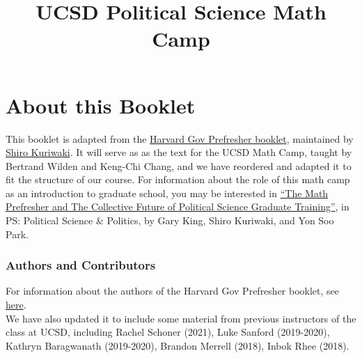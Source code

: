 \documentclass[
  letterpaper,
]{book}
\title{UCSD Political Science Math Camp}
\author{}
\date{}
\renewcommand*\contentsname{Table of contents}
\newcommand\contentsname{Table of contents}
\theoremstyle{definition}
\theoremstyle{definition}
\theoremstyle{plain}
\theoremstyle{definition}
\theoremstyle{plain}
\theoremstyle{plain}
\theoremstyle{remark}
\begin{document}
\frontmatter
\maketitle
\ifdefined\Shaded\renewenvironment{Shaded}{\begin{tcolorbox}[boxrule=0pt, borderline west={3pt}{0pt}{shadecolor}, sharp corners, breakable, frame hidden, enhanced, interior hidden]}{\end{tcolorbox}}\fi

\renewcommand*\contentsname{Table of contents}
{
\hypersetup{linkcolor=}
\setcounter{tocdepth}{2}
\tableofcontents
}
\listoffigures
\listoftables
\mainmatter
{}

\hypertarget{about-this-booklet}{%
\chapter*{About this Booklet}\label{about-this-booklet}}

This booklet is adapted from the
\href{https://iqss.github.io/prefresher/}{Harvard Gov Prefresher
booklet}, maintained by \href{https://www.shirokuriwaki.com}{Shiro
Kuriwaki}. It will serve as as the text for the UCSD Math Camp, taught
by Bertrand Wilden and Keng-Chi Chang, and we have reordered and adapted
it to fit the structure of our course. For information about the role of
this math camp as an introduction to graduate school, you may be
interested in \href{https://gking.harvard.edu/prefresher}{``The Math
Prefresher and The Collective Future of Political Science Graduate
Training''}, in PS: Political Science \& Politics, by Gary King, Shiro
Kuriwaki, and Yon Soo Park.

\hypertarget{authors-and-contributors}{%
\subsection*{Authors and Contributors}\label{authors-and-contributors}}

For information about the authors of the Harvard Gov Prefresher booklet,
see
\href{https://iqss.github.io/prefresher/index.html\#authors-and-contributors}{here}.\\
We have also updated it to include some material from previous
instructors of the class at UCSD, including Rachel Schoner (2021), Luke
Sanford (2019-2020), Kathryn Baragwanath (2019-2020), Brandon Merrell
(2018), Inbok Rhee (2018).
\end{document}
